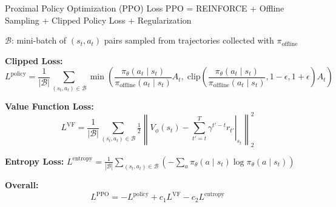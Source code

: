 \begin{frame}{Proximal Policy Optimization (PPO) Loss}
  PPO \cite{schulman2017ppo} = REINFORCE + Offline Sampling + Clipped Policy Loss + Regularization

  \vspace{0.3em}
  $\mathcal{B}$: mini-batch of $(s_t, a_t)$ pairs sampled from trajectories collected with $\pi_\text{offline}$

  \vspace{0.3em}
  \textbf{Clipped Loss:}
  \[
    L^\text{policy} = \frac{1}{|\mathcal{B}|} \sum_{(s_t, a_t) \in \mathcal{B}} \min\!\left(\frac{\pi_\theta(a_t \mid s_t)}{\pi_\text{offline}(a_t \mid s_t)} A_t, \; \text{clip}\!\left(\frac{\pi_\theta(a_t \mid s_t)}{\pi_\text{offline}(a_t \mid s_t)}, 1{-}\epsilon, 1{+}\epsilon\right) A_t\right)
  \]

  \textbf{Value Function Loss:}
  \[
    L^\text{VF} = \frac{1}{|\mathcal{B}|} \sum_{(s_t, a_t) \in \mathcal{B}} \tfrac{1}{2} \left\| V_\phi(s_t) - \left. \sum_{t'=t}^{T} \gamma^{t'-t} r_{t'} \right|_{s_t} \right\|_2^2
  \]

  \textbf{Entropy Loss:} $L^\text{entropy} = \frac{1}{|\mathcal{B}|} \sum_{(s_t, a_t) \in \mathcal{B}} \left( -\sum_a \pi_\theta(a \mid s_t) \log \pi_\theta(a \mid s_t) \right)$

  \vspace{0.3em}
  \textbf{Overall:}
  \[
    \boxed{L^\text{PPO} = -L^\text{policy} + c_1 L^\text{VF} - c_2 L^\text{entropy}}
  \]
\end{frame}


